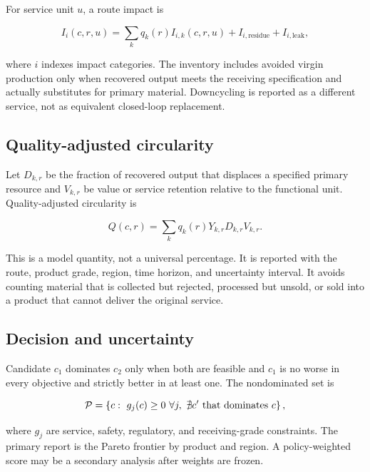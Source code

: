 \documentclass[conference]{IEEEtran}
\begin{document}
For service unit $u$, a route impact is

\begin{equation}
I_i(c,r,u)=\sum_k q_k(r)I_{i,k}(c,r,u)+I_{i,\mathrm{residue}}+I_{i,\mathrm{leak}},
\label{eq:impact}
\end{equation}

where $i$ indexes impact categories. The inventory includes avoided virgin production only when recovered output meets the receiving specification and actually substitutes for primary material. Downcycling is reported as a different service, not as equivalent closed-loop replacement.

\subsection{Quality-adjusted circularity}

Let $D_{k,r}$ be the fraction of recovered output that displaces a specified primary resource and $V_{k,r}$ be value or service retention relative to the functional unit. Quality-adjusted circularity is

\begin{equation}
Q(c,r)=\sum_k q_k(r)Y_{k,r}D_{k,r}V_{k,r}.
\label{eq:circularity}
\end{equation}

This is a model quantity, not a universal percentage. It is reported with the route, product grade, region, time horizon, and uncertainty interval. It avoids counting material that is collected but rejected, processed but unsold, or sold into a product that cannot deliver the original service.

\subsection{Decision and uncertainty}

Candidate $c_1$ dominates $c_2$ only when both are feasible and $c_1$ is no worse in every objective and strictly better in at least one. The nondominated set is

\begin{equation}
\mathcal{P}=\left\{c:\ g_j(c)\geq0\ \forall j,\ \nexists c'\ {\rm that\ dominates}\ c\right\},
\label{eq:pareto}
\end{equation}

where $g_j$ are service, safety, regulatory, and receiving-grade constraints. The primary report is the Pareto frontier by product and region. A policy-weighted score may be a secondary analysis after weights are frozen.
\end{document}
